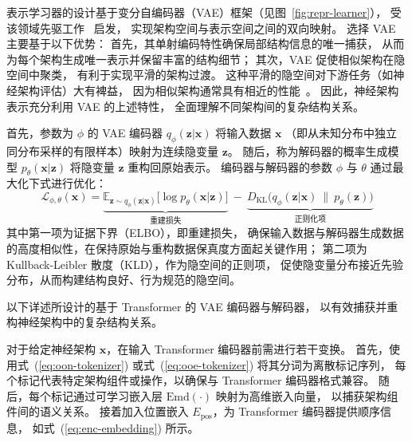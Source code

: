 \documentclass[../main.tex]{subfiles}
\begin{document}
表示学习器的设计基于变分自编码器（VAE）框架（见图~\ref{fig:repr-learner}），
受该领域先驱工作~\cite{DBLP:conf/nips/YanZAZ020,DBLP:conf/ijcnn/LukasikFZHK21} 启发，
实现架构空间与表示空间之间的双向映射。
选择 VAE 主要基于以下优势：
首先，其单射编码特性确保局部结构信息的唯一捕获，
从而为每个架构生成唯一表示并保留丰富的结构细节；
其次，VAE 促使相似架构在隐空间中聚类，
有利于实现平滑的架构过渡。
这种平滑的隐空间对下游任务（如神经架构评估）大有裨益，
因为相似架构通常具有相近的性能~\cite{Liu2020ASO}。
因此，神经架构表示充分利用 VAE 的上述特性，
全面理解不同架构间的复杂结构关系。

首先，参数为 $ \phi $ 的 VAE 编码器 $ q_{\phi}(\bm{z}|\bm{x}) $ 将输入数据 $ \bm{x} $
（即从未知分布中独立同分布采样的有限样本）映射为连续隐变量 $ \bm{z} $。
随后，称为解码器的概率生成模型 $ p_{\theta}(\bm{x}|\bm{z}) $ 将隐变量 $ \bm{z} $ 重构回原始表示。
编码器与解码器的参数 $ \phi $ 与 $ \theta $ 通过最大化下式进行优化：
\begin{equation}\label{eq:vae-loss}
	\mathcal{L}_{\phi,\theta}{(\bm{x})} = \underbrace{\mathbb{E}_{\bm{z} \sim q_{\phi}(\bm{z}|\bm{x})}{\big[\log{p_\theta(\bm{x}|\bm{z})}\big]}}_{\text{重建损失}} \:{-}\: \underbrace{D_\mathrm{KL}\big(q_\phi(\bm{z}|\bm{x})\:\|\:p_\theta(\bm{z})\big)}_{\text{正则化项}}
\end{equation}
其中第一项为证据下界（ELBO），即重建损失，
确保输入数据与解码器生成数据的高度相似性，在保持原始与重构数据保真度方面起关键作用；
第二项为Kullback-Leibler 散度（KLD），作为隐空间的正则项，
促使隐变量分布接近先验分布，从而构建结构良好、行为规范的隐空间。

以下详述所设计的基于 Transformer 的 VAE 编码器与解码器，
以有效捕获并重构神经架构中的复杂结构关系。


对于给定神经架构 $ \bm{x} $，在输入 Transformer 编码器前需进行若干变换。
首先，使用式~(\ref{eq:oon-tokenizer}) 或式~(\ref{eq:ooe-tokenizer}) 将其分词为离散标记序列，
每个标记代表特定架构组件或操作，以确保与 Transformer 编码器格式兼容。
随后，每个标记通过可学习嵌入层 $ \mathrm{Emd}(\cdot) $ 映射为高维嵌入向量，
以捕获架构组件间的语义关系。
接着加入位置嵌入 $ E_\mathrm{pos} $，为 Transformer 编码器提供顺序信息，
如式~(\ref{eq:enc-embedding}) 所示。
\end{document}
